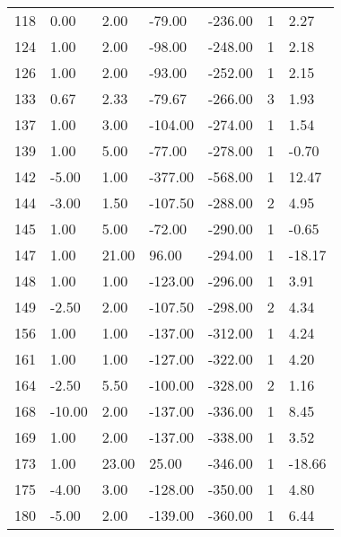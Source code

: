 \begin{appendices}
\begin{longtable}[c]{@{}lllllll@{}}
118 & 0.00 & 2.00 & -79.00 & -236.00 & 1 & 2.27 \\

124 & 1.00 & 2.00 & -98.00 & -248.00 & 1 & 2.18 \\

126 & 1.00 & 2.00 & -93.00 & -252.00 & 1 & 2.15 \\

133 & 0.67 & 2.33 & -79.67 & -266.00 & 3 & 1.93 \\

137 & 1.00 & 3.00 & -104.00 & -274.00 & 1 & 1.54 \\

139 & 1.00 & 5.00 & -77.00 & -278.00 & 1 & -0.70 \\

142 & -5.00 & 1.00 & -377.00 & -568.00 & 1 & 12.47 \\

144 & -3.00 & 1.50 & -107.50 & -288.00 & 2 & 4.95 \\

145 & 1.00 & 5.00 & -72.00 & -290.00 & 1 & -0.65 \\

147 & 1.00 & 21.00 & 96.00 & -294.00 & 1 & -18.17 \\

148 & 1.00 & 1.00 & -123.00 & -296.00 & 1 & 3.91 \\

149 & -2.50 & 2.00 & -107.50 & -298.00 & 2 & 4.34 \\

156 & 1.00 & 1.00 & -137.00 & -312.00 & 1 & 4.24 \\

161 & 1.00 & 1.00 & -127.00 & -322.00 & 1 & 4.20 \\

164 & -2.50 & 5.50 & -100.00 & -328.00 & 2 & 1.16 \\

168 & -10.00 & 2.00 & -137.00 & -336.00 & 1 & 8.45 \\

169 & 1.00 & 2.00 & -137.00 & -338.00 & 1 & 3.52 \\

173 & 1.00 & 23.00 & 25.00 & -346.00 & 1 & -18.66 \\

175 & -4.00 & 3.00 & -128.00 & -350.00 & 1 & 4.80 \\

180 & -5.00 & 2.00 & -139.00 & -360.00 & 1 & 6.44 \\


\end{longtable}
\end{appendices}

